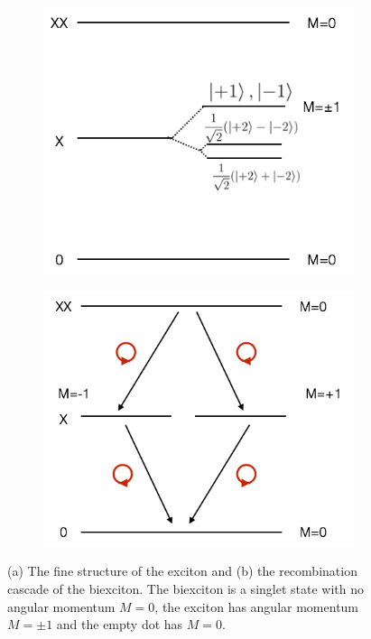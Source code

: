 \documentclass[12pt, twoside]{article}
\numberwithin{equation}{section}
\begin{document}
\begin{figure}[h!]
\centering
\begin{subfigure}{.5\textwidth}
  \centering
  \includegraphics[width=0.8\linewidth]{images/finestructurenofss.png}
  \caption{}
  \label{fig:sub1}
\end{subfigure}%
\begin{subfigure}{.5\textwidth}
  \centering
  \includegraphics[width=0.8\linewidth]{images/decaypathsnofss.png}
  \caption{}
  \label{fig:decaypath}
\end{subfigure}
\caption{(a) The fine structure of the exciton and (b) the recombination cascade of the biexciton. The biexciton is a singlet state with no angular momentum $M = 0$, the exciton has angular momentum $M = \pm 1$ and the empty dot has $M=0$.}
\label{fig:decaypathsandfinestructure}
\end{figure}
\end{document}
